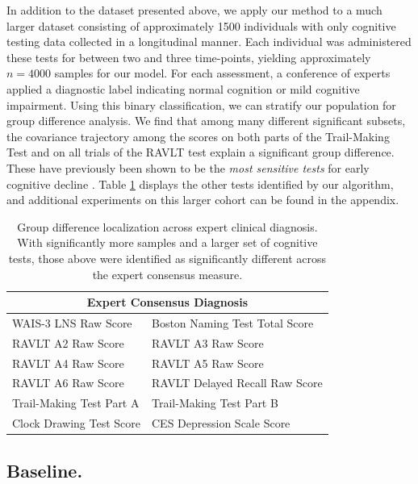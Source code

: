 In addition to the dataset presented above, we apply our method to a much larger dataset consisting of approximately 1500 individuals with only cognitive testing data collected in a longitudinal manner. Each individual was administered these tests for between two and three time-points, yielding approximately $n = 4000$ samples for our model. For each assessment, a conference of experts applied a diagnostic label indicating normal cognition or mild cognitive impairment. Using this binary classification, we can stratify our population for group difference analysis.
We find that among many different significant subsets, the covariance trajectory among the scores on both parts of the Trail-Making Test and 
on all trials of the RAVLT test explain a significant group difference. These have previously been shown to be the {\em most sensitive tests} for 
early cognitive decline \citep{albert2001preclinical}. 
Table \ref{tab:wrapCC} displays the other tests identified by our algorithm, and additional experiments on this larger cohort 
can be found in the appendix. 
%

\begin{table}
	\centering
	\begin{tabular}{ll}
		\toprule
		\multicolumn{2}{c}{\textbf{Expert Consensus Diagnosis}}\\ \midrule \midrule
		WAIS-3 LNS Raw Score &
		Boston Naming Test Total Score \\
		RAVLT A2 Raw Score &
		RAVLT A3 Raw Score \\
		RAVLT A4 Raw Score &
		RAVLT A5 Raw Score \\
		RAVLT A6 Raw Score &
		RAVLT Delayed Recall Raw Score \\
		Trail-Making Test Part A &
		Trail-Making Test Part B \\
		Clock Drawing Test Score &
		CES Depression Scale Score \\
		\bottomrule
		\bottomrule
	\end{tabular}
	\caption[Localized results across expert clinical diagnosis]{Group difference localization across expert clinical diagnosis. With significantly more samples and a larger set of cognitive tests, those above were identified as significantly different across the expert consensus measure.}
	\label{tab:wrapCC}
\end{table}

\subsection{Baseline.}

